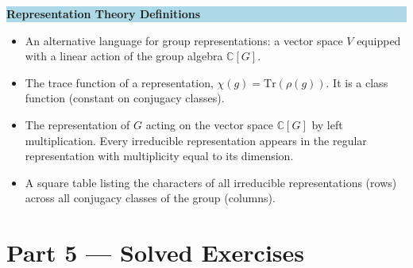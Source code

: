 \documentclass[12pt, a4paper]{article}
\newenvironment{namedconcept}[1]
  {\par\medskip\fillcolorbox{LightBlue}{NavyBlue}{#1}}
  {\par\medskip}
\newcommand{\fillcolorbox}[3]{%
  \noindent
  \filldrawbox{#1}{#2}{\textbf{\sffamily\color{white}#3}}\par\nobreak\vspace{4pt}
}
\newcommand{\filldrawbox}[3]{%
  \colorbox{#1}{\parbox{\dimexpr\linewidth-2\fboxsep\relax}{%
    \vspace{4pt}\noindent\hspace{4pt}#3\vspace{4pt}%
  }}%
}
\begin{document}
\begin{namedconcept}{Representation Theory Definitions}
\begin{itemize}
  \item {} An alternative language for group representations: a vector space $V$ equipped with a linear action of the group algebra $\mathbb{C}[G]$.
  \item {} The trace function of a representation, $\chi(g) = \text{Tr}(\rho(g))$. It is a class function (constant on conjugacy classes).
  \item {} The representation of $G$ acting on the vector space $\mathbb{C}[G]$ by left multiplication. Every irreducible representation appears in the regular representation with multiplicity equal to its dimension.
  \item {} A square table listing the characters of all irreducible representations (rows) across all conjugacy classes of the group (columns).
\end{itemize}
\end{namedconcept}

\newpage

\section{Part 5 --- Solved Exercises}
\end{document}
